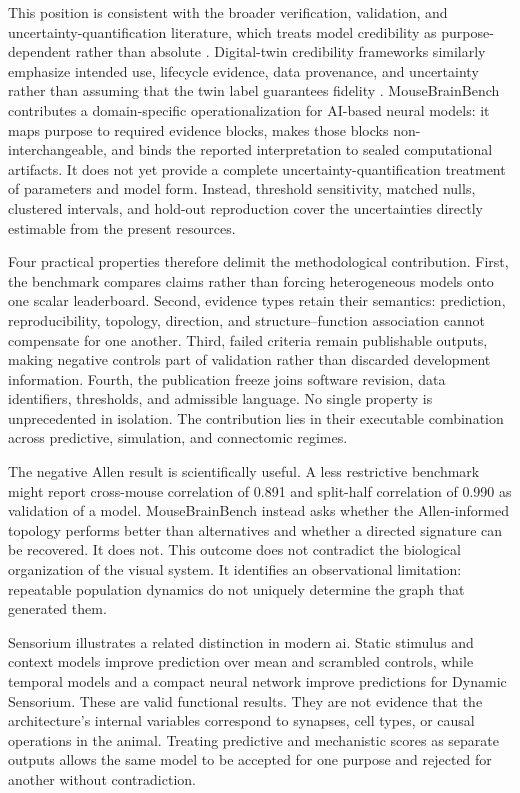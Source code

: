 \documentclass[a4paper,fleqn]{cas-sc}
\begin{document}
This position is consistent with the broader verification, validation, and
uncertainty-quantification literature, which treats model credibility as
purpose-dependent rather than absolute
\citep{asme2018vv40,oberkampf2010verification,sargent2013verification,riedmaier2021vvuq}.
Digital-twin credibility frameworks similarly emphasize intended use,
lifecycle evidence, data provenance, and uncertainty rather than assuming
that the twin label guarantees fidelity
\citep{jones2020digitaltwin,rasheed2020digitaltwin,fuller2020digitaltwin,shao2022credibility}. MouseBrainBench contributes a
domain-specific operationalization for AI-based neural models: it maps purpose
to required evidence blocks, makes those blocks non-interchangeable, and binds
the reported interpretation to sealed computational artifacts. It does not yet
provide a complete uncertainty-quantification treatment of parameters and
model form. Instead, threshold sensitivity, matched nulls, clustered intervals,
and hold-out reproduction cover the uncertainties directly estimable from the
present resources.

Four practical properties therefore delimit the methodological contribution.
First, the benchmark compares claims rather than forcing heterogeneous models
onto one scalar leaderboard. Second, evidence types retain their semantics:
prediction, reproducibility, topology, direction, and structure--function
association cannot compensate for one another. Third, failed criteria remain
publishable outputs, making negative controls part of validation rather than
discarded development information. Fourth, the publication freeze joins
software revision, data identifiers, thresholds, and admissible language. No
single property is unprecedented in isolation. The contribution lies in their
executable combination across predictive, simulation, and connectomic regimes.

The negative Allen result is scientifically useful. A less restrictive
benchmark might report cross-mouse correlation of 0.891 and split-half
correlation of 0.990 as validation of a model. MouseBrainBench instead asks
whether the Allen-informed topology performs better than alternatives and
whether a directed signature can be recovered. It does not. This outcome does
not contradict the biological organization of the visual system. It identifies
an observational limitation: repeatable population dynamics do not uniquely
determine the graph that generated them.

Sensorium illustrates a related distinction in modern \acs{ai}.
Static stimulus and context models improve prediction over mean and scrambled
controls, while temporal models and a compact neural network improve predictions
for Dynamic Sensorium. These are valid functional results. They are not evidence
that the architecture's internal variables correspond to synapses, cell types,
or causal operations in the animal. Treating predictive and mechanistic scores
as separate outputs allows the same model to be accepted for one purpose and
rejected for another without contradiction.
\end{document}
